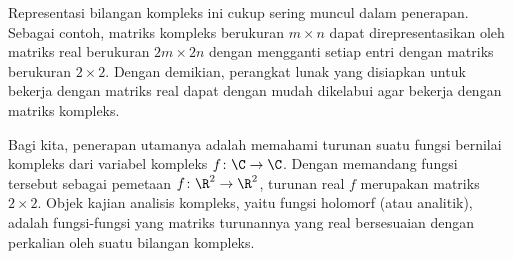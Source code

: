 
Representasi bilangan kompleks ini cukup sering muncul dalam penerapan.
Sebagai contoh,
matriks kompleks berukuran $m \times n$ dapat direpresentasikan oleh
matriks real berukuran $2m \times 2n$ dengan mengganti setiap entri dengan
matriks berukuran $2 \times 2$.
Dengan demikian, perangkat lunak yang disiapkan untuk bekerja dengan matriks
real dapat dengan mudah dikelabui agar bekerja dengan matriks kompleks.

Bagi kita, penerapan utamanya adalah memahami turunan suatu
fungsi bernilai kompleks dari variabel kompleks $f \colon \C \to \C$.
Dengan memandang fungsi tersebut sebagai pemetaan $f \colon \R^2 \to \R^2$,
turunan real $f$ merupakan matriks $2 \times 2$.
Objek kajian analisis kompleks, yaitu fungsi holomorf (atau analitik),
adalah fungsi-fungsi yang matriks turunannya yang real bersesuaian dengan
perkalian oleh suatu bilangan kompleks.
